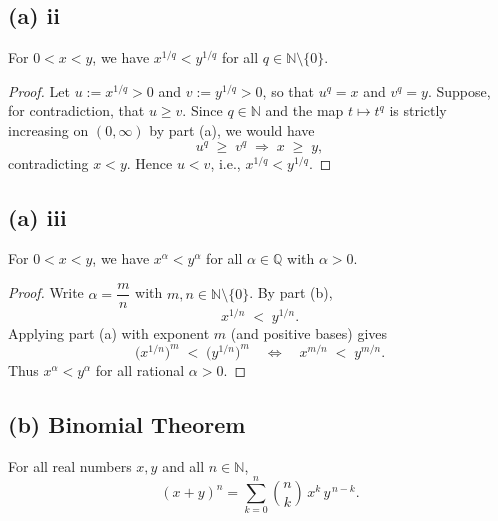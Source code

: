 \documentclass[12pt,a4paper]{article}
\theoremstyle{definition}
\theoremstyle{remark}
\begin{document}
\subsection*{(a) ii}
For $0 < x < y$, we have $x^{1/q} < y^{1/q}$ for all $q \in \mathbb{N}\setminus\{0\}$.

\begin{proof}
Let $u := x^{1/q} > 0$ and $v := y^{1/q} > 0$, so that $u^q = x$ and $v^q = y$.
Suppose, for contradiction, that $u \ge v$. Since $q\in\mathbb{N}$ and the map $t\mapsto t^q$ is strictly increasing on $(0,\infty)$ by part (a), we would have
\[
u^q \;\ge\; v^q \;\Longrightarrow\; x \;\ge\; y,
\]
contradicting $x<y$. Hence $u<v$, i.e., $x^{1/q} < y^{1/q}$.
\end{proof}

\subsection*{(a) iii}
For $0 < x < y$, we have $x^\alpha < y^\alpha$ for all $\alpha \in \mathbb{Q}$ with $\alpha>0$.

\begin{proof}
Write $\alpha=\dfrac{m}{n}$ with $m,n\in\mathbb{N}\setminus\{0\}$. By part (b),
\[
x^{1/n} \;<\; y^{1/n}.
\]
Applying part (a) with exponent $m$ (and positive bases) gives
\[
\bigl(x^{1/n}\bigr)^m \;<\; \bigl(y^{1/n}\bigr)^m
\quad\Longleftrightarrow\quad
x^{m/n} \;<\; y^{m/n}.
\]
Thus $x^\alpha < y^\alpha$ for all rational $\alpha>0$.
\end{proof}

\subsection*{(b) Binomial Theorem}
For all real numbers $x,y$ and all $n\in\mathbb{N}$,
\[
(x+y)^n = \sum_{k=0}^{n} \binom{n}{k}\, x^{k}\, y^{\,n-k}.
\]
\end{document}

